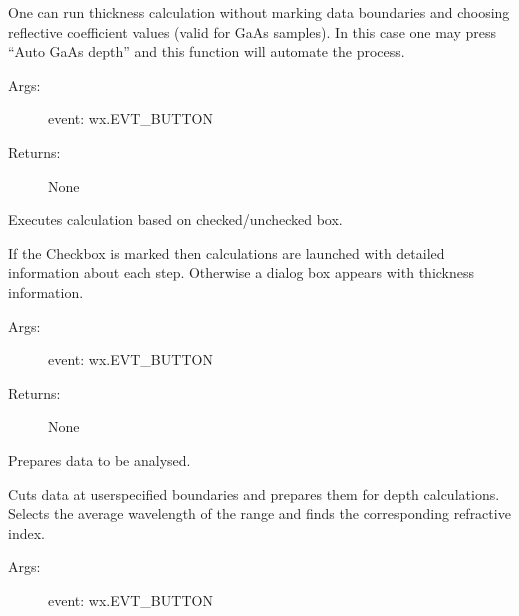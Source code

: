 \documentclass[letterpaper,10pt,english]{sphinxmanual}
\begin{document}
\begin{fulllineitems}
\begin{fulllineitems}
One can run thickness calculation without marking data boundaries
and choosing reflective coefficient values (valid for GaAs samples). 
In this case one may press “Auto GaAs depth” and this function will 
automate the process.
\begin{description}
\item[{Args:}] \leavevmode
event: wx.EVT\_BUTTON

\item[{Returns:}] \leavevmode
None

\end{description}

\end{fulllineitems}


\begin{fulllineitems}
\label{\detokenize{GUI:GUI.MyPanel.calc_choice}}
Executes calculation based on checked/unchecked box.

If the Checkbox is marked then calculations are launched with detailed 
information about each step. Otherwise a dialog box appears with thickness 
information.
\begin{description}
\item[{Args:}] \leavevmode
event: wx.EVT\_BUTTON

\item[{Returns:}] \leavevmode
None

\end{description}

\end{fulllineitems}


\begin{fulllineitems}
\label{\detokenize{GUI:GUI.MyPanel.data_prep}}
Prepares data to be analysed.

Cuts data at user\sphinxhyphen{}specified boundaries and prepares them for depth calculations.
Selects the average wavelength of the range and finds the corresponding refractive
index.
\begin{description}
\item[{Args:}] \leavevmode
event: wx.EVT\_BUTTON


\end{description}
\end{fulllineitems}
\end{fulllineitems}
\end{document}
